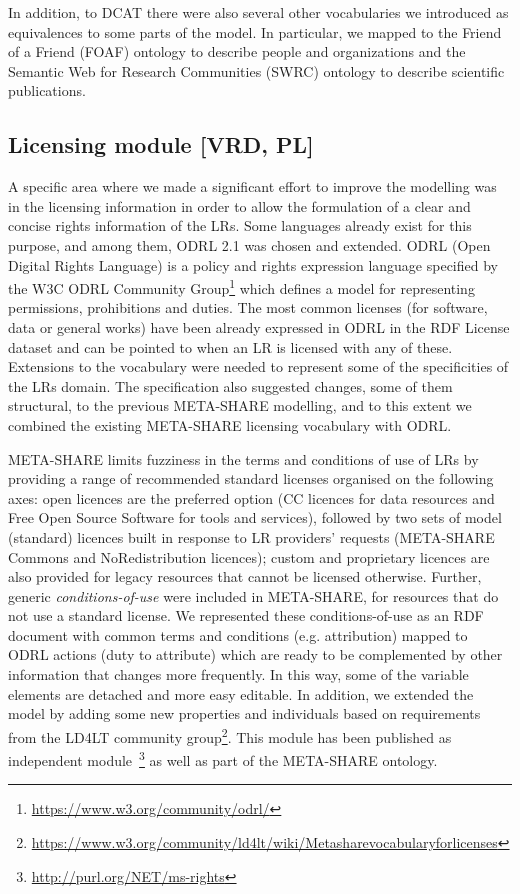 \documentclass{llncs}
\begin{document}
{In addition, to DCAT there were also several other vocabularies we introduced
as equivalences to some parts of the model. In particular, we mapped to the Friend of
a Friend (FOAF) ontology to describe people and organizations and the Semantic
Web for Research Communities (SWRC) ontology to describe scientific
publications.

\subsection{Licensing module [VRD, PL]}
\label{sec:licensing}

A specific area where we made a significant effort to improve the modelling was
in the licensing information in order to allow the formulation of a clear and
concise rights information of the LRs. 
Some languages already exist for this purpose, and among them, ODRL 2.1 was
chosen and extended. ODRL (Open Digital Rights Language) is a policy and rights
expression language specified by the W3C ODRL Community
Group\footnote{\url{https://www.w3.org/community/odrl/}} which defines a model
for representing permissions, prohibitions and duties.
The most common licenses (for software, data or general works) have been already expressed in ODRL in the RDF License dataset\cite{rdflicense} and can be pointed to when an LR is licensed with any of these.
Extensions to the vocabulary were needed to represent some of the specificities
of the LRs domain. The specification also suggested changes, some of them
structural, to the previous META-SHARE modelling, and to this extent we
combined the existing META-SHARE licensing vocabulary with ODRL.


META-SHARE limits fuzziness in the terms and conditions of use of LRs by
providing a range
of recommended standard licenses organised on the following axes: open licences are the preferred option
(CC licences for data resources and Free Open Source Software for tools and
services), followed by two sets of model (standard) licences built in response
to LR providers' requests (META-SHARE Commons and NoRedistribution licences);
custom and proprietary licences are also provided for legacy
resources that cannot be licensed otherwise. 
Further, generic \textit{conditions-of-use} were included in META-SHARE, for
resources that do not use a standard license. We represented these
conditions-of-use as an RDF
document with common terms and conditions (e.g. attribution) mapped to ODRL
actions (duty to attribute) which are ready to be complemented by other
information that changes more frequently. In this way, some of the variable
elements are detached and more easy editable. 
In addition, we extended the model by adding some new properties and individuals
based on requirements from the LD4LT community group\footnote{\url{https://www.w3.org/community/ld4lt/wiki/Metasharevocabularyforlicenses}}.
This module has been published as independent module~\footnote{\url{http://purl.org/NET/ms-rights}} 
as well as part of the META-SHARE ontology.

}
\end{document}
